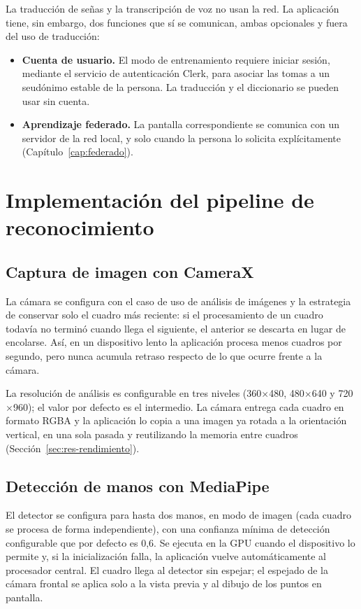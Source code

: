 La traducción de señas y la transcripción de voz no usan la red. La aplicación tiene, sin embargo, dos funciones que sí se comunican, ambas opcionales y fuera del uso de traducción:

\begin{itemize}
    \item \textbf{Cuenta de usuario.} El modo de entrenamiento requiere iniciar sesión, mediante el servicio de autenticación Clerk, para asociar las tomas a un seudónimo estable de la persona. La traducción y el diccionario se pueden usar sin cuenta.
    \item \textbf{Aprendizaje federado.} La pantalla correspondiente se comunica con un servidor de la red local, y solo cuando la persona lo solicita explícitamente (Capítulo~\ref{cap:federado}).
\end{itemize}

\section{Implementación del pipeline de reconocimiento}

\subsection{Captura de imagen con CameraX}

La cámara se configura con el caso de uso de análisis de imágenes y la estrategia de conservar solo el cuadro más reciente: si el procesamiento de un cuadro todavía no terminó cuando llega el siguiente, el anterior se descarta en lugar de encolarse. Así, en un dispositivo lento la aplicación procesa menos cuadros por segundo, pero nunca acumula retraso respecto de lo que ocurre frente a la cámara.

La resolución de análisis es configurable en tres niveles (360$\times$480, 480$\times$640 y 720$\times$960); el valor por defecto es el intermedio. La cámara entrega cada cuadro en formato RGBA y la aplicación lo copia a una imagen ya rotada a la orientación vertical, en una sola pasada y reutilizando la memoria entre cuadros (Sección~\ref{sec:res-rendimiento}).

\subsection{Detección de manos con MediaPipe}

El detector se configura para hasta dos manos, en modo de imagen (cada cuadro se procesa de forma independiente), con una confianza mínima de detección configurable que por defecto es 0,6. Se ejecuta en la GPU cuando el dispositivo lo permite y, si la inicialización falla, la aplicación vuelve automáticamente al procesador central. El cuadro llega al detector sin espejar; el espejado de la cámara frontal se aplica solo a la vista previa y al dibujo de los puntos en pantalla.

